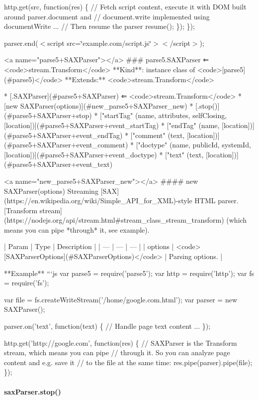 http.\+get(src, function(res) \{ // Fetch script content, execute it with D\+OM built around {\ttfamily parser.\+document} and // {\ttfamily document.\+write} implemented using {\ttfamily document\+Write} ... // Then resume the parser resume(); \}); \});

parser.\+end(\textquotesingle{}$<$script src=\char`\"{}example.\+com/script.\+js\char`\"{}$>$$<$/script$>$\textquotesingle{}); 
\begin{DoxyCode}
<a name="parse5+SAXParser"></a>
### parse5.SAXParser ⇐ <code>stream.Transform</code>
**Kind**: instance class of <code>[parse5](#parse5)</code>
**Extends:** <code>stream.Transform</code>

* [.SAXParser](#parse5+SAXParser) ⇐ <code>stream.Transform</code>
  * [new SAXParser(options)](#new\_parse5+SAXParser\_new)
  * [.stop()](#parse5+SAXParser+stop)
  * ["startTag" (name, attributes, selfClosing, [location])](#parse5+SAXParser+event\_startTag)
  * ["endTag" (name, [location])](#parse5+SAXParser+event\_endTag)
  * ["comment" (text, [location])](#parse5+SAXParser+event\_comment)
  * ["doctype" (name, publicId, systemId, [location])](#parse5+SAXParser+event\_doctype)
  * ["text" (text, [location])](#parse5+SAXParser+event\_text)

<a name="new\_parse5+SAXParser\_new"></a>
#### new SAXParser(options)
Streaming [SAX](https://en.wikipedia.org/wiki/Simple\_API\_for\_XML)-style HTML parser.
[Transform stream](https://nodejs.org/api/stream.html#stream\_class\_stream\_transform)
(which means you can pipe *through* it, see example).


| Param | Type | Description |
| --- | --- | --- |
| options | <code>[SAXParserOptions](#SAXParserOptions)</code> | Parsing options. |

**Example**
```js
var parse5 = require('parse5');
var http = require('http');
var fs = require('fs');

var file = fs.createWriteStream('/home/google.com.html');
var parser = new SAXParser();

parser.on('text', function(text) \{
 // Handle page text content
 ...
\});

http.get('http://google.com', function(res) \{
 // SAXParser is the Transform stream, which means you can pipe
 // through it. So you can analyze page content and e.g. save it
 // to the file at the same time:
 res.pipe(parser).pipe(file);
\});
\end{DoxyCode}
 \label{_parse5+SAXParser+stop}%
 \paragraph*{sax\+Parser.\+stop()}

